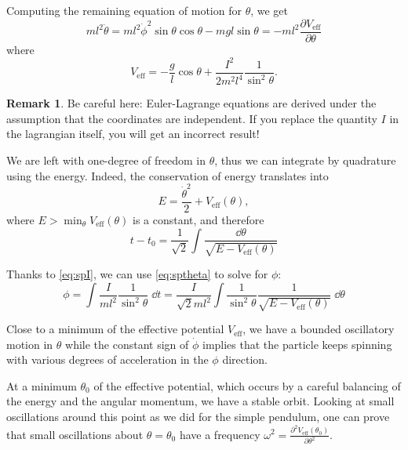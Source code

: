 \documentclass[english,fontsize=11pt,paper=b5]{scrbook}
\numberwithin{equation}{chapter}
\theoremstyle{definition}
\newtheorem{remark}{Remark}[chapter]
\begin{document}
    Computing the remaining equation of motion for $\theta$, we get
    \begin{equation}
      ml^2 \ddot \theta = ml^2 \dot\phi^2\sin\theta\cos\theta - mgl \sin\theta = -ml^2\frac{\partial V_{\mathrm{eff}}}{\partial \theta}
    \end{equation}
    where
    \begin{equation}
      V_{\mathrm{eff}} = -\frac{g}l\cos\theta + \frac{I^2}{2m^2l^4}\frac1{\sin^2\theta}.
    \end{equation}

    \begin{remark}
      Be careful here: Euler-Lagrange equations are derived under the assumption that the coordinates are independent. If you replace the quantity $I$ in the lagrangian itself, you will get an incorrect result!
    \end{remark}

    We are left with one-degree of freedom in $\theta$, thus we can integrate by quadrature using the energy.
    Indeed, the conservation of energy translates into
    \begin{equation}
      E = \frac{\dot \theta^2}2 + V_{\mathrm{eff}}(\theta),
    \end{equation}
    where $E>\min_\theta V_{\mathrm{eff}}(\theta)$ is a constant, and therefore
    \begin{equation}\label{eq:sptheta}
      t - t_0 = \frac1{\sqrt2}\int\frac{\dd \theta}{\sqrt{E - V_{\mathrm{eff}}(\theta)}}
    \end{equation}

    Thanks to \eqref{eq:spI}, we can use \eqref{eq:sptheta} to solve for $\phi$:
    \begin{equation}
      \phi = \int \frac{I}{ml^2} \frac1{\sin^2\theta} \;\dd t
      = \frac{I}{\sqrt{2} m l^2}  \int \frac1{\sin^2\theta} \frac{1}{\sqrt{E - V_{\mathrm{eff}}(\theta)}}\; \dd \theta
    \end{equation}

    Close to a minimum of the effective potential $V_{\mathrm{eff}}$, we have a bounded oscillatory motion in $\theta$ while the constant sign of $\dot\phi$ implies that the particle keeps spinning with various degrees of acceleration in the $\phi$ direction.

    At a minimum $\theta_0$ of the effective potential, which occurs by a careful balancing of the energy and the angular momentum, we have a stable orbit.
    Looking at small oscillations around this point as we did for the simple pendulum, one can prove that small oscillations about $\theta = \theta_0$ have a frequency $\omega^2 = \frac{\partial^2 V_{\mathrm{eff}}(\theta_0)}{\partial\theta^2}$.
\end{document}
